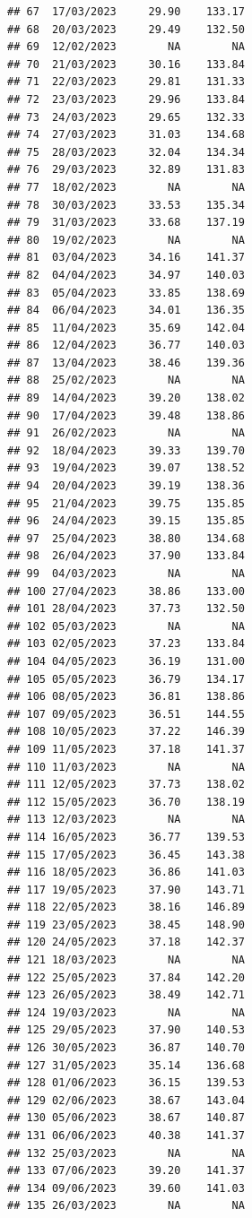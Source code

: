 \documentclass[
]{article}
\begin{document}
\begin{verbatim}
## 67  17/03/2023     29.90    133.17
## 68  20/03/2023     29.49    132.50
## 69  12/02/2023        NA        NA
## 70  21/03/2023     30.16    133.84
## 71  22/03/2023     29.81    131.33
## 72  23/03/2023     29.96    133.84
## 73  24/03/2023     29.65    132.33
## 74  27/03/2023     31.03    134.68
## 75  28/03/2023     32.04    134.34
## 76  29/03/2023     32.89    131.83
## 77  18/02/2023        NA        NA
## 78  30/03/2023     33.53    135.34
## 79  31/03/2023     33.68    137.19
## 80  19/02/2023        NA        NA
## 81  03/04/2023     34.16    141.37
## 82  04/04/2023     34.97    140.03
## 83  05/04/2023     33.85    138.69
## 84  06/04/2023     34.01    136.35
## 85  11/04/2023     35.69    142.04
## 86  12/04/2023     36.77    140.03
## 87  13/04/2023     38.46    139.36
## 88  25/02/2023        NA        NA
## 89  14/04/2023     39.20    138.02
## 90  17/04/2023     39.48    138.86
## 91  26/02/2023        NA        NA
## 92  18/04/2023     39.33    139.70
## 93  19/04/2023     39.07    138.52
## 94  20/04/2023     39.19    138.36
## 95  21/04/2023     39.75    135.85
## 96  24/04/2023     39.15    135.85
## 97  25/04/2023     38.80    134.68
## 98  26/04/2023     37.90    133.84
## 99  04/03/2023        NA        NA
## 100 27/04/2023     38.86    133.00
## 101 28/04/2023     37.73    132.50
## 102 05/03/2023        NA        NA
## 103 02/05/2023     37.23    133.84
## 104 04/05/2023     36.19    131.00
## 105 05/05/2023     36.79    134.17
## 106 08/05/2023     36.81    138.86
## 107 09/05/2023     36.51    144.55
## 108 10/05/2023     37.22    146.39
## 109 11/05/2023     37.18    141.37
## 110 11/03/2023        NA        NA
## 111 12/05/2023     37.73    138.02
## 112 15/05/2023     36.70    138.19
## 113 12/03/2023        NA        NA
## 114 16/05/2023     36.77    139.53
## 115 17/05/2023     36.45    143.38
## 116 18/05/2023     36.86    141.03
## 117 19/05/2023     37.90    143.71
## 118 22/05/2023     38.16    146.89
## 119 23/05/2023     38.45    148.90
## 120 24/05/2023     37.18    142.37
## 121 18/03/2023        NA        NA
## 122 25/05/2023     37.84    142.20
## 123 26/05/2023     38.49    142.71
## 124 19/03/2023        NA        NA
## 125 29/05/2023     37.90    140.53
## 126 30/05/2023     36.87    140.70
## 127 31/05/2023     35.14    136.68
## 128 01/06/2023     36.15    139.53
## 129 02/06/2023     38.67    143.04
## 130 05/06/2023     38.67    140.87
## 131 06/06/2023     40.38    141.37
## 132 25/03/2023        NA        NA
## 133 07/06/2023     39.20    141.37
## 134 09/06/2023     39.60    141.03
## 135 26/03/2023        NA        NA

\end{verbatim}
\end{document}
